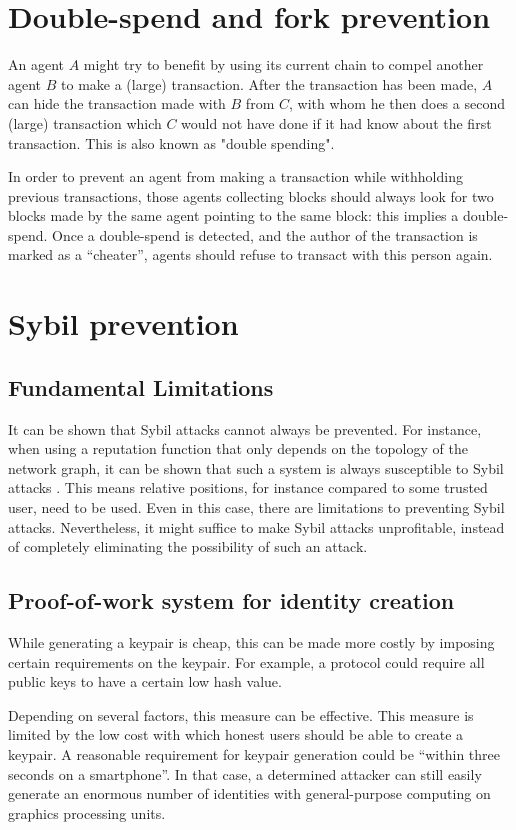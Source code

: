 \section{Double-spend and fork prevention}
An agent $A$ might try to benefit by using its current chain to compel another agent $B$ to make a (large) transaction. After the transaction has been made, $A$ can hide the transaction made with $B$ from $C$, with whom he then does a second (large) transaction which $C$ would not have done if it had know about the first transaction. This is also known as "double spending".

In order to prevent an agent from making a transaction while withholding previous transactions, those agents collecting blocks should always look for two blocks made by the same agent pointing to the same block: this implies a double-spend. Once a double-spend is detected, and the author of the transaction is marked as a ``cheater'', agents should refuse to transact with this person again.

\section{Sybil prevention}
\subsection{Fundamental Limitations}
It can be shown that Sybil attacks cannot always be prevented. 
For instance, when using a reputation function that only depends on the topology of the network graph, 
it can be shown that such a system is always susceptible to Sybil attacks \cite{cheng2005sybilproof}. 
This means relative positions, 
for instance compared to some trusted user, 
need to be used. 
Even in this case, 
there are limitations to preventing Sybil attacks. 
Nevertheless, it might suffice to make Sybil attacks unprofitable, 
instead of completely eliminating the possibility of such an attack. 

\subsection{Proof-of-work system for identity creation}\label{sssection:chain_creation_cost}
While generating a keypair is cheap, this can be made more costly by imposing certain requirements on the keypair. For example, a protocol could require all public keys to have a certain low hash value.

Depending on several factors, this measure can be effective. This measure is limited by the low cost with which honest users should be able to create a keypair. A reasonable requirement for keypair generation could be ``within three seconds on a smartphone''. In that case, a determined attacker can still easily generate an enormous number of identities with general-purpose computing on graphics processing units.

